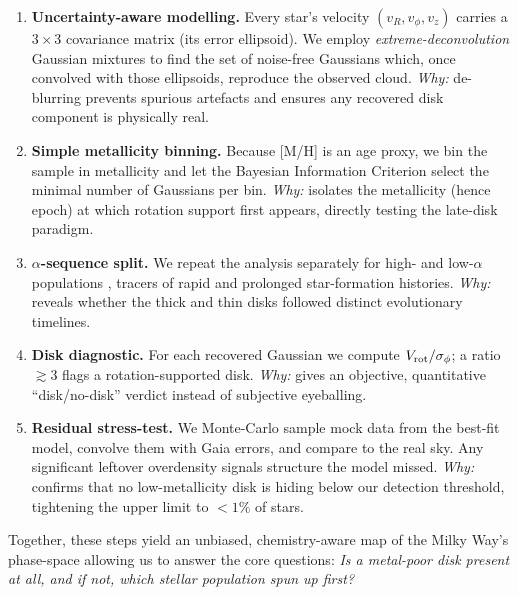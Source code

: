 \documentclass[a4paper,10pt]{article}
\begin{document}
\begin{multicols}{2}
\begin{enumerate}
  \item \textbf{Uncertainty-aware modelling.}  
        Every star’s velocity $(v_R,v_\phi,v_z)$ carries a $3\times3$ covariance
        matrix (its error ellipsoid).  We employ \emph{extreme-deconvolution}
        Gaussian mixtures \cite{Bovy2011,pygmmis} to find the set of
        noise-free Gaussians which, once convolved with those ellipsoids,
        reproduce the observed cloud.  
        \textit{Why:} de-blurring prevents spurious artefacts and ensures any
        recovered disk component is physically real.

  \item \textbf{Simple metallicity binning.}  
        Because [M/H] is an age proxy, we bin the sample in metallicity and let
        the Bayesian Information Criterion select the minimal number of
        Gaussians per bin.  
        \textit{Why:} isolates the metallicity (hence epoch) at which
        rotation support first appears, directly testing the late-disk
        paradigm.

  \item \textbf{$\alpha$-sequence split.}  
        We repeat the analysis separately for high- and low-$\alpha$
        populations \cite{Vis2024}, tracers of rapid and prolonged
        star-formation histories.  
        \textit{Why:} reveals whether the thick and thin disks followed
        distinct evolutionary timelines.

  \item \textbf{Disk diagnostic.}  
        For each recovered Gaussian we compute $V_{\rm rot}/\sigma_\phi$; a
        ratio $\gtrsim3$ flags a rotation-supported disk.  
        \textit{Why:} gives an objective, quantitative “disk/no-disk” verdict
        instead of subjective eyeballing.

  \item \textbf{Residual stress-test.}  
        We Monte-Carlo sample mock data from the best-fit model, convolve them
        with Gaia errors, and compare to the real sky.  Any significant
        leftover overdensity signals structure the model missed.  
        \textit{Why:} confirms that no low-metallicity disk is hiding below our
        detection threshold, tightening the upper limit to \mbox{$<1\%$} of
        stars.
\end{enumerate}

Together, these steps yield an unbiased, chemistry-aware map of the Milky
Way’s phase-space allowing us to answer the core questions:  
\emph{Is a metal-poor disk present at all, and if not, which stellar population
spun up first?}



\end{multicols}
\end{document}
